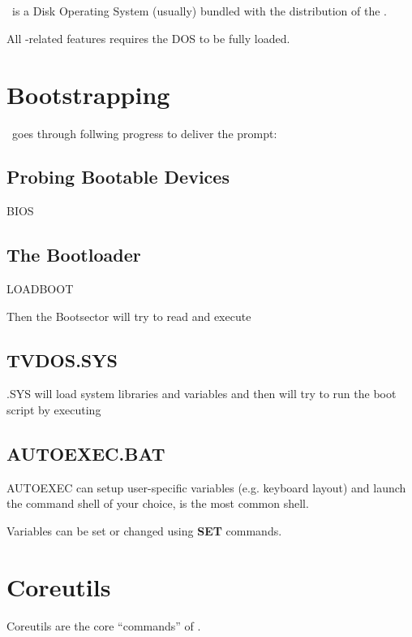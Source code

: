 \chapter{\thedos}

\thedos\ is a Disk Operating System (usually) bundled with the distribution of the \thismachine.

All \thedos-related features requires the DOS to be fully loaded.


\chapter{Bootstrapping}

\thedos\ goes through follwing progress to deliver the  prompt:

\section{Probing Bootable Devices}
BIOS

\section{The Bootloader}
LOADBOOT

Then the Bootsector will try to read and execute 

\section{TVDOS.SYS}
\thedos.SYS will load system libraries and variables and then will try to run the boot script by executing 

\section{AUTOEXEC.BAT}

AUTOEXEC can setup user-specific variables (e.g. keyboard layout) and launch the command shell of your choice,  is the most common shell.

Variables can be set or changed using \textbf{SET} commands.



\chapter{Coreutils}

Coreutils are the core ``commands'' of \thedos.

